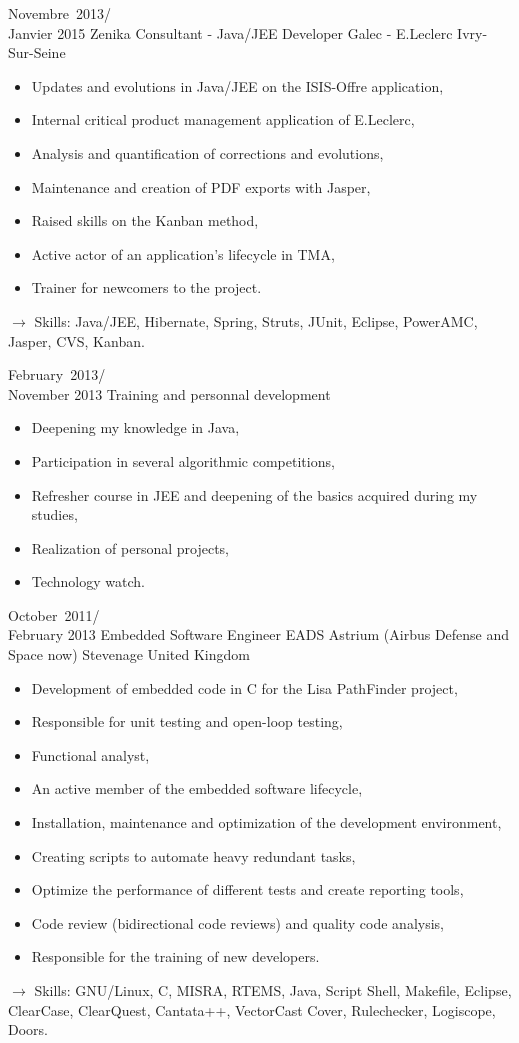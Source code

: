\documentclass[11pt,a4paper]{moderncv}
\begin{document}
\cventry
{Novembre\ 2013/\\Janvier 2015}
{Zenika Consultant - Java/JEE Developer}
{Galec - E.Leclerc}
{Ivry-Sur-Seine}
{}
{\begin{itemize}
\item Updates and evolutions in Java/JEE on the ISIS-Offre application,
\item Internal critical product management application of E.Leclerc,
\item Analysis and quantification of corrections and evolutions,
\item Maintenance and creation of PDF exports with Jasper,
\item Raised skills on the Kanban method,
\item Active actor of an application's lifecycle in TMA,
\item Trainer for newcomers to the project.
\end{itemize}
$\rightarrow$ Skills: Java/JEE, Hibernate, Spring, Struts, JUnit, Eclipse, PowerAMC, Jasper, CVS, Kanban.
}   %

\cventry
{February\ 2013/\\November 2013}
{Training and personnal development}{}{}{}
{\begin{itemize}
\item Deepening my knowledge in Java,
\item Participation in several algorithmic competitions,
\item Refresher course in JEE and deepening of the basics acquired during my studies,
\item Realization of personal projects,
\item Technology watch.
\end{itemize}
}   %

\cventry
{October\ 2011/\\February 2013}
{Embedded Software Engineer}
{EADS Astrium (Airbus Defense and Space now)}
{Stevenage United Kingdom}
{}
{\begin{itemize}
\item Development of embedded code in C for the Lisa PathFinder project,
\item Responsible for unit testing and open-loop testing,
\item Functional analyst,
\item An active member of the embedded software lifecycle,
\item Installation, maintenance and optimization of the development environment,
\item Creating scripts to automate heavy redundant tasks,
\item Optimize the performance of different tests and create reporting tools,
\item Code review (bidirectional code reviews) and quality code analysis,
\item Responsible for the training of new developers.
\end{itemize}
$\rightarrow$ Skills: GNU/Linux, C, MISRA, RTEMS, Java, Script Shell, Makefile, Eclipse, ClearCase, ClearQuest, Cantata++, VectorCast Cover, Rulechecker, Logiscope, Doors.
}   %
\end{document}
